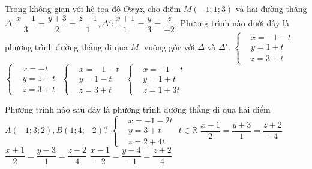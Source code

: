 \begin{ex}%
	Trong không gian với hệ tọa độ $Oxyz$, cho điểm $M(-1;1;3)$ và hai đường thẳng \break$\Delta\colon\dfrac{x-1}{3}=\dfrac{y+3}{2}=\dfrac{z-1}{1}, \Delta '\colon\dfrac{x+1}{1}=\dfrac{y}{3}=\dfrac{z}{-2}$. Phương trình nào dưới đây là phương trình đường thẳng đi qua $M$, vuông góc với $\Delta $ và $\Delta '$. 
	\choice
	{\True $\left\{\begin{aligned}& x=-1-t \\
	& y=1+t \\
	& z=3+t 
	\end{aligned}\right.$	}
	{$\left\{\begin{aligned}& x=-t \\
	& y=1+t \\
	& z=3+t 
	\end{aligned}\right.$	}
	{$\left\{\begin{aligned}& x=-1-t \\
	& y=1-t \\
	& z=3+t 
	\end{aligned}\right.$	}
	{$\left\{\begin{aligned}& x=-1-t \\
	& y=1+t \\
	& z=1+3t 
	\end{aligned}\right.$}
\end{ex}
\begin{ex}%
	Phương trình nào sau đây là phương trình đường thẳng đi qua hai điểm $A\left({-1;3;2}\right),B\left({1;4;-2}\right)$?
	\choice
	{$\left\{\begin{aligned}& x=-1-2t \\& y=3+t \\& z=2+4t 
	\end{aligned}\right. \,\, t\in \mathbb{R}$
	}
	{$\dfrac{x-1}{2}=\dfrac{y+3}{1}=\dfrac{z+2}{-4}$}
	{$\dfrac{x+1}{2}=\dfrac{y-3}{1}=\dfrac{z-2}{4}$}
	{\True $\dfrac{x-1}{-2}=\dfrac{y-4}{-1}=\dfrac{z+2}{4}$}
\end{ex}
